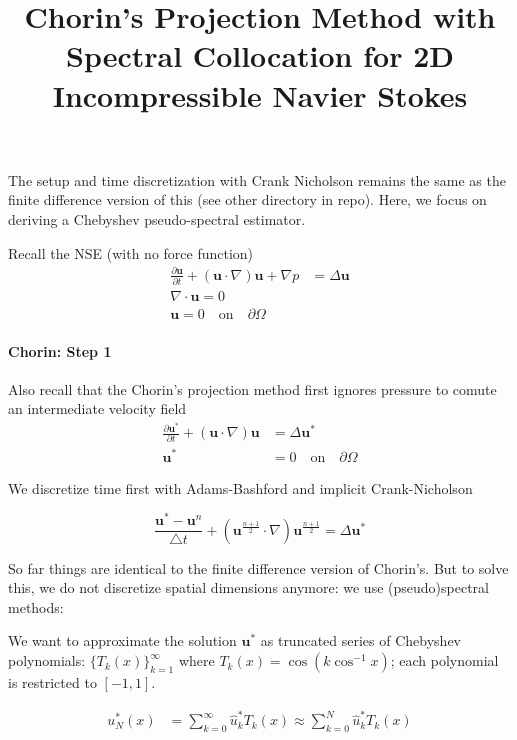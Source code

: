\documentclass[12pt]{article}
\begin{document}
\title{Chorin's Projection Method with Spectral Collocation for 2D Incompressible Navier Stokes}
\maketitle

The setup and time discretization with Crank Nicholson remains the same as the finite difference version of this (see other directory in repo). Here, we focus on deriving a Chebyshev pseudo-spectral estimator.

Recall the NSE (with no force function)
\begin{align*}
    \frac{\partial \mathbf{u}}{\partial t} + (\mathbf{u}\cdot \nabla)\mathbf{u} + \nabla p &= \Delta \mathbf{u} \\
    \nabla \cdot \mathbf{u} = 0 \\
    \mathbf{u} = 0 \quad\text{on}\quad \partial \Omega
\end{align*}

\paragraph{Chorin: Step 1} Also recall that the Chorin's projection method first ignores pressure to comute an intermediate velocity field
\begin{align*}
    \frac{\partial \mathbf{u}^*}{\partial t} + (\mathbf{u}\cdot \nabla)\mathbf{u} &= \Delta \mathbf{u}^* \\
    \mathbf{u}^* &= 0 \quad\text{on}\quad \partial \Omega
\end{align*}

We discretize time first with Adams-Bashford and implicit Crank-Nicholson

\begin{equation*}
    \frac{\mathbf{u}^* - \mathbf{u}^n}{\bigtriangleup t} + (\mathbf{u}^{\frac{n+1}{2}} \cdot \nabla) \mathbf{u}^{\frac{n+1}{2}} = \Delta \mathbf{u}^*
\end{equation*}

So far things are identical to the finite difference version of Chorin's. But to solve this, we do not discretize spatial dimensions anymore: we use (pseudo)spectral methods:

We want to approximate the solution $\mathbf{u}^*$ as truncated series of Chebyshev polynomials: $\{ T_k(x) \}_{k=1}^{\infty}$ where $T_k(x) = \cos(k \cos^{-1}x)$; each polynomial is restricted to $[-1, 1]$.

\begin{align*}
    u^*_{N}(x) &= \sum_{k=0}^{\infty} \hat{u}^*_k T_k(x) \approx \sum_{k=0}^{N} \hat{u}^*_k T_k(x)
\end{align*}
\end{document}
